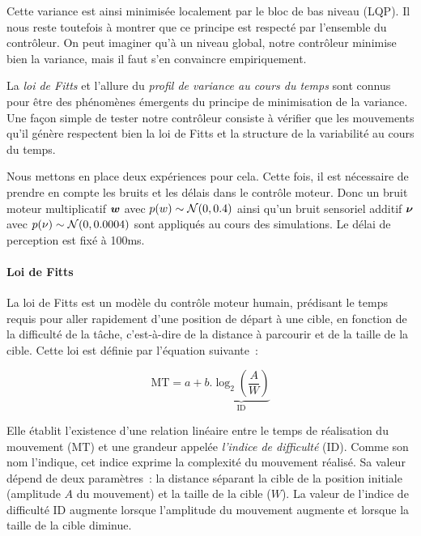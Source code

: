 \documentclass[pdftex,a4paper,11pt]{article}
\begin{document}
Cette variance est ainsi minimisée localement par le bloc de bas
niveau (LQP). Il nous reste toutefois à montrer que ce principe est respecté
par l'ensemble du contrôleur. On peut imaginer qu'à un niveau global, notre
contrôleur minimise bien la variance, mais il faut s'en convaincre empiriquement.

La \emph{loi de Fitts} et l'allure du \emph{profil de variance au cours
du temps} sont connus pour être des phénomènes émergents du principe de
minimisation de la variance.
Une façon simple de tester notre contrôleur consiste à vérifier que les
mouvements qu'il génère respectent bien la loi de Fitts et la structure de la
variabilité au cours du temps.

Nous mettons en place deux expériences pour cela.
Cette fois, il est nécessaire de prendre en compte les bruits et les délais
dans le contrôle moteur.
Donc un bruit moteur multiplicatif $\boldsymbol{w}$ avec $p(w) \sim \mathcal{N}(0, 0.4)$ ainsi
qu'un bruit sensoriel additif $\boldsymbol{\nu}$ avec $p(\nu) \sim \mathcal{N}(0, 0.0004)$
sont appliqués au cours des simulations. Le délai de perception est fixé à 100ms.


\paragraph{Loi de Fitts}
La loi de Fitts \cite{fitts54_JEP} est un modèle du contrôle moteur humain, prédisant
le temps requis pour aller rapidement d'une position de départ à une cible, en
fonction de la difficulté de la tâche, c'est-à-dire de la distance à parcourir
et de la taille de la cible. Cette loi est définie par l'équation suivante~:

\begin{equation}
    \text{MT} = a + b . \underbrace{\log_2\left(\frac{A}{W}\right)}_\text{ID}
\end{equation}

Elle établit l'existence d'une relation linéaire entre le temps de réalisation
du mouvement ($\text{MT}$) et une grandeur appelée \emph{l'indice de
difficulté} ($\text{ID}$).
Comme son nom l'indique, cet indice exprime la complexité du mouvement réalisé.
Sa valeur dépend de deux paramètres~: la distance séparant la cible de la
position initiale (amplitude $A$ du mouvement) et la taille de la cible ($W$).
La valeur de l'indice de difficulté $\text{ID}$ augmente lorsque l'amplitude du mouvement
augmente et lorsque la taille de la cible diminue.
\end{document}
